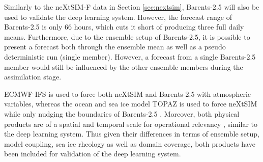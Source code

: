 \documentclass[../main/thesis.tex]{subfiles}
\begin{document}
Similarly to the neXtSIM-F data in Section \ref{sec:nextsim}, Barents-2.5 will also be used to validate the deep learning system. However, the forecast range of Barents-2.5 is only 66 hours, which cuts it short of producing three full daily means. Furthermore, due to the ensemble setup of Barents-2.5, it is possible to present a forecast both through the ensemble mean as well as a pseudo deterministic run (single member). However, a forecast from a single Barents-2.5 member would still be influenced by the other ensemble members during the assimilation stage. 

ECMWF IFS is used to force both neXtSIM and Barents-2.5 with atmospheric variables, whereas the ocean and sea ice model TOPAZ \citep{Sakov2012} is used to force neXtSIM \citep{Williams2021} while only nudging the boundaries of Barents-2.5 \citep{Roehrs2022}. Moreover, both physical products are of a spatial and temporal scale for operational relevancy \citep{Wagner2020}, similar to the deep learning system. Thus given their differences in terms of ensemble setup, model coupling, sea ice rheology as well as domain coverage, both products have been included for validation of the deep learning system.

\biblio
\end{document}
